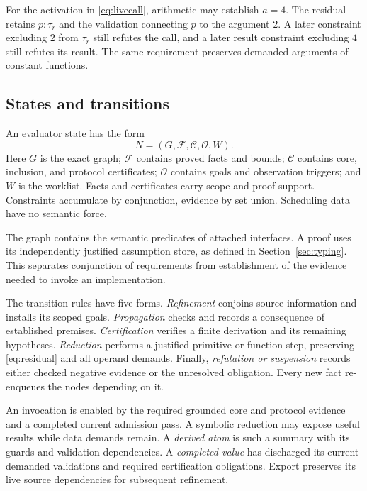 \documentclass[10pt,a4paper]{article}
\theoremstyle{remark}
\begin{document}
For the activation in \eqref{eq:livecall}, arithmetic may establish $a=4$.
The residual retains $p:\tau_r$ and the validation connecting $p$ to the
argument $2$. A later constraint excluding $2$ from $\tau_r$ still refutes the
call, and a later result constraint excluding $4$ still refutes its result.
The same requirement preserves demanded arguments of constant functions.

\subsection{States and transitions}
An evaluator state has the form
\[
 N=(G,\mathcal F,\mathcal C,\mathcal O,W).
\]
Here $G$ is the exact graph; $\mathcal F$ contains proved facts and bounds;
$\mathcal C$ contains core, inclusion, and protocol certificates;
$\mathcal O$ contains goals and observation triggers; and $W$ is the worklist.
Facts and certificates carry scope and proof support. Constraints accumulate
by conjunction, evidence by set union. Scheduling data have no semantic force.

The graph contains the semantic predicates of attached interfaces. A proof
uses its independently justified assumption store, as defined in
Section~\ref{sec:typing}. This separates conjunction of requirements from
establishment of the evidence needed to invoke an implementation.

The transition rules have five forms. \emph{Refinement} conjoins source
information and installs its scoped goals. \emph{Propagation} checks and records
a consequence of established premises. \emph{Certification} verifies a finite
derivation and its remaining hypotheses. \emph{Reduction} performs a justified
primitive or function step, preserving \eqref{eq:residual} and all operand
demands. Finally, \emph{refutation or suspension} records either checked
negative evidence or the unresolved obligation. Every new fact re-enqueues the
nodes depending on it.

An invocation is enabled by the required grounded core and protocol evidence
and a completed current admission pass. A symbolic reduction may expose useful
results while data demands remain. A \emph{derived atom} is such a summary with
its guards and validation dependencies. A \emph{completed value} has discharged
its current demanded validations and required certification obligations.
Export preserves its live source dependencies for subsequent refinement.
\end{document}
